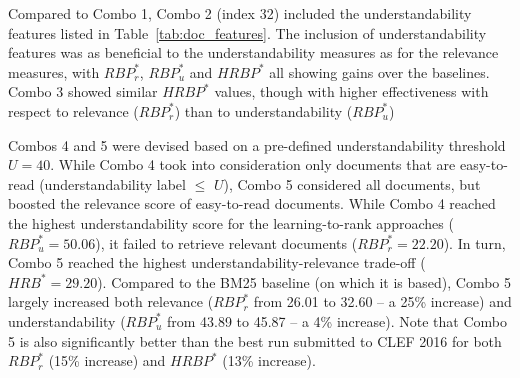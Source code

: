 Compared to Combo 1, Combo 2 (index 32) included the understandability features listed in Table~\ref{tab:doc_features}. The inclusion of understandability features was as beneficial to the understandability measures as for the relevance measures, with $RBP_r^*$, $RBP_u^*$ and $HRBP^*$ all showing gains over the baselines. Combo 3 showed similar $HRBP^*$ values, though with higher effectiveness with respect to relevance ($RBP_r^*$) than to understandability ($RBP_u^*$)


Combos 4 and 5 were devised based on a pre-defined understandability threshold $U=40$. While Combo 4 took into consideration only documents that are easy-to-read (understandability label $\le$ $U$), Combo 5 considered all documents, but boosted the relevance score of easy-to-read documents. While Combo 4 reached the highest understandability score for the learning-to-rank approaches ($RBP_u^{*}=50.06$), it failed to retrieve relevant documents ($RBP_r^{*}=22.20$). In turn, Combo 5 reached the highest understandability-relevance trade-off ($HRB^{*}=29.20$). Compared to the BM25 baseline (on which it is based), Combo 5  largely increased both relevance ($RBP_r^*$ from 26.01 to 32.60 -- a 25\% increase) and understandability ($RBP_u^*$ from 43.89 to 45.87 -- a 4\% increase). Note that Combo 5 is also significantly better than the best run submitted to CLEF 2016 for both $RBP_r^{*}$ (15\% increase) and $HRBP^{*}$ (13\% increase).



